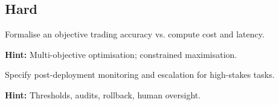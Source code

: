 \subsection*{Hard}

\begin{problem}
Formalise an objective trading accuracy vs. compute cost and latency.

\textbf{Hint:} Multi-objective optimisation; constrained maximisation.
\end{problem}

\begin{problem}
Specify post-deployment monitoring and escalation for high-stakes tasks.

\textbf{Hint:} Thresholds, audits, rollback, human oversight.
\end{problem}


